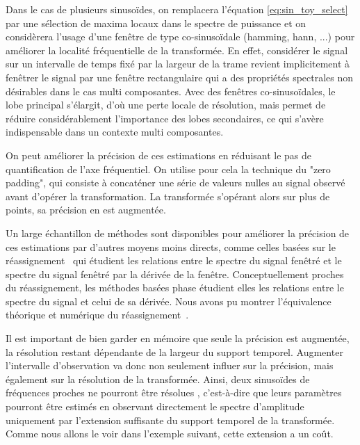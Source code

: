 Dans le cas de plusieurs sinusoïdes, on remplacera l'équation \ref{eq:sin_toy_select} par une sélection de maxima locaux dans le spectre de puissance et on considèrera l'usage d'une fenêtre de type co-sinusoïdale (hamming, hann, ...) pour améliorer la localité fréquentielle de la transformée\cite{harris1978use}. En effet, considérer le signal sur un intervalle de temps fixé par la largeur de la trame revient implicitement à fenêtrer le signal par une fenêtre rectangulaire qui a des propriétés spectrales non désirables dans le cas multi composantes. Avec des fenêtres co-sinusoïdales, le lobe principal s'élargit, d'où une perte locale de résolution, mais permet de réduire considérablement l'importance des lobes secondaires, ce qui s'avère indispensable dans un contexte multi composantes.

On peut améliorer la précision de ces estimations en réduisant le pas de quantification de l'axe fréquentiel. On utilise pour cela la technique du "zero padding", qui consiste à concaténer une série de valeurs nulles au signal observé avant d'opérer la transformation. La transformée s'opérant alors sur plus de points, sa précision en est augmentée.

Un large échantillon de méthodes sont disponibles pour améliorer la précision de ces estimations par d'autres moyens moins directs, comme  celles basées sur le réassignement~\cite{auger1995improving} qui étudient les relations entre le spectre du signal fenêtré et le spectre du signal fenêtré par la dérivée de la fenêtre. Conceptuellement proches du réassignement, les méthodes basées phase étudient elles les relations entre le spectre du signal et celui de sa dérivée. Nous avons pu montrer l'équivalence théorique et numérique du réassignement~\cite{lagrangeJaes07}.

Il est important de bien garder en mémoire que seule la précision est augmentée, la résolution restant dépendante de la largeur du support temporel.  Augmenter l'intervalle d'observation va donc non seulement influer sur la précision, mais également sur la résolution de la transformée. Ainsi, deux sinusoïdes de fréquences proches ne pourront être \og résolues \fg, c'est-à-dire que leurs paramètres pourront être estimés en observant directement le spectre d'amplitude uniquement par l'extension suffisante du support temporel de la transformée. Comme nous allons le voir dans l'exemple suivant, cette extension a un coût.

